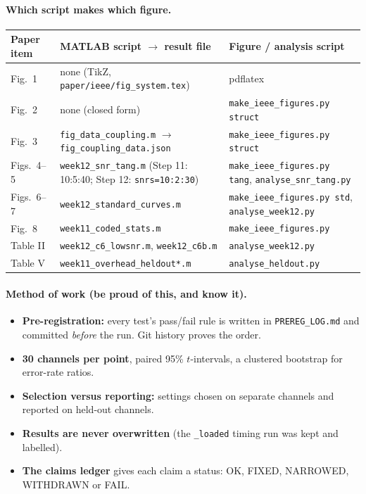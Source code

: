 \documentclass[11pt,a4paper]{article}
\begin{document}
\paragraph{Which script makes which figure.}
\begin{center}\small
\begin{tabularx}{\textwidth}{lXl}
\toprule
Paper item & MATLAB script $\to$ result file & Figure / analysis script\\
\midrule
Fig.~1 & none (TikZ, \texttt{paper/ieee/fig\_system.tex}) & pdflatex\\
Fig.~2 & none (closed form) & \texttt{make\_ieee\_figures.py struct}\\
Fig.~3 & \texttt{fig\_data\_coupling.m} $\to$ \texttt{fig\_coupling\_data.json} & \texttt{make\_ieee\_figures.py struct}\\
Figs.~4--5 & \texttt{week12\_snr\_tang.m} (Step 11: 10:5:40; Step 12: \texttt{snrs=10:2:30}) & \texttt{make\_ieee\_figures.py tang}, \texttt{analyse\_snr\_tang.py}\\
Figs.~6--7 & \texttt{week12\_standard\_curves.m} & \texttt{make\_ieee\_figures.py std}, \texttt{analyse\_week12.py}\\
Fig.~8 & \texttt{week11\_coded\_stats.m} & \texttt{make\_ieee\_figures.py}\\
Table II & \texttt{week12\_c6\_lowsnr.m}, \texttt{week12\_c6b.m} & \texttt{analyse\_week12.py}\\
Table V & \texttt{week11\_overhead\_heldout*.m} & \texttt{analyse\_heldout.py}\\
\bottomrule
\end{tabularx}
\end{center}

\paragraph{Method of work (be proud of this, and know it).}
\begin{itemize}
\item \textbf{Pre-registration:} every test's pass/fail rule is written in \texttt{PREREG\_LOG.md} and committed
\emph{before} the run. Git history proves the order.
\item \textbf{30 channels per point}, paired 95\% $t$-intervals, a clustered bootstrap for error-rate ratios.
\item \textbf{Selection versus reporting:} settings chosen on separate channels and reported on held-out channels.
\item \textbf{Results are never overwritten} (the \texttt{\_loaded} timing run was kept and labelled).
\item \textbf{The claims ledger} gives each claim a status: OK, FIXED, NARROWED, WITHDRAWN or FAIL.
\end{itemize}
\end{document}
